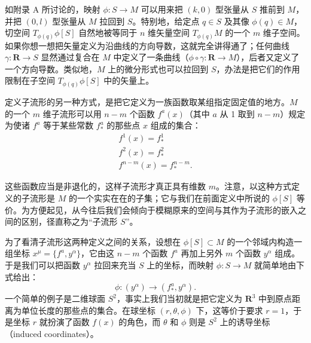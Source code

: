 如附录 A 所讨论的，映射 $\phi : S \to M$ 可以用来把 $(k,0)$ 型张量从 $S$ 推前到 $M$，并把 $(0,l)$ 型张量从 $M$ 拉回到 $S$。特别地，给定点 $q \in S$ 及其像 $\phi(q) \in M$，切空间 $T_{\phi(q)}\phi[S]$ 自然地被等同于 $n$ 维矢量空间 $T_{\phi(q)}M$ 的一个 $m$ 维子空间。如果你想一想把矢量定义为沿曲线的方向导数，这就完全讲得通了；任何曲线 $\gamma : \mathbf{R} \to S$ 显然通过复合在 $M$ 中定义了一条曲线（$\phi \circ \gamma : \mathbf{R} \to M$），后者又定义了一个方向导数。类似地，$M$ 上的微分形式也可以拉回到 $S$，办法是把它们的作用限制在子空间 $T_{\phi(q)}\phi[S]$ 中的矢量上。

定义子流形的另一种方式，是把它定义为一族函数取某组指定固定值的地方。$M$ 的一个 $m$ 维子流形可以用 $n - m$ 个函数 $f^a(x)$（其中 $a$ 从 1 取到 $n - m$）规定为使诸 $f^a$ 等于某些常数 $f^a_*$ 的那些点 $x$ 组成的集合：
\begin{gather*}
f^1(x) = f^1_* \\
f^2(x) = f^2_* \\[1em]
f^{n-m}(x) = f^{n-m}_*. \tag{C.1}
\end{gather*}

这些函数应当是非退化的，这样子流形才真正具有维数 $m$。注意，以这种方式定义的子流形是 $M$ 的一个实实在在的子集；它与我们在前面定义中所说的 $\phi[S]$ 等价。为方便起见，从今往后我们会倾向于模糊原来的空间与其作为子流形的嵌入之间的区别，径直称之为“子流形 $S$”。

为了看清子流形这两种定义之间的关系，设想在 $\phi[S] \subset M$ 的一个邻域内构造一组坐标 $x^\mu = \{f^a, y^\alpha\}$，它由这 $n - m$ 个函数 $f^a$ 再加上另外 $m$ 个函数 $y^\alpha$ 组成。于是我们可以把函数 $y^\alpha$ 拉回来充当 $S$ 上的坐标，而映射 $\phi : S \to M$ 就简单地由下式给出：
\begin{equation*}
\phi : (y^\alpha) \to (f^a_*, y^\alpha).
\tag{C.2}
\end{equation*}
一个简单的例子是二维球面 $S^2$，事实上我们当初就是把它定义为 $\mathbf{R}^3$ 中到原点距离为单位长度的那些点的集合。在球坐标 $(r, \theta, \phi)$ 下，这等价于要求 $r = 1$，于是坐标 $r$ 就扮演了函数 $f(x)$ 的角色，而 $\theta$ 和 $\phi$ 则是 $S^2$ 上的诱导坐标（induced coordinates）。

